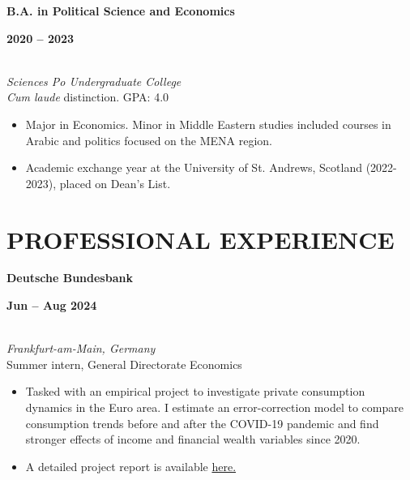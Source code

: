 \documentclass[a4paper,9pt]{extarticle}
\begin{document}
\noindent
\begin{minipage}[t]{0.7\textwidth}
  \textbf{B.A. in Political Science and Economics}
\end{minipage}%
\begin{minipage}[t]{0.3\textwidth}
  \raggedleft \textbf{2020 -- 2023}
\end{minipage}
\\
\textit{Sciences Po Undergraduate College} \\
\textit{Cum laude} distinction. GPA: 4.0
\begin{itemize}[noitemsep, topsep=0pt, left=0.65cm]
    \item Major in Economics. Minor in Middle Eastern studies included courses in Arabic and politics focused on the MENA region. 
    \item Academic exchange year at the University of St. Andrews, Scotland (2022-2023), placed on Dean's List. 
\end{itemize} 


\section*{PROFESSIONAL EXPERIENCE}

\noindent
\newline
\begin{minipage}[t]{0.7\textwidth}
  \textbf{Deutsche Bundesbank}
\end{minipage}%
\begin{minipage}[t]{0.3\textwidth}
  \raggedleft \textbf{Jun -- Aug 2024}
\end{minipage}
\\
\textit{Frankfurt-am-Main, Germany} \\ 
Summer intern, General Directorate Economics 
\begin{itemize}[noitemsep, topsep=0pt, left=0.65cm]
    \item  Tasked with an empirical project to investigate private consumption dynamics in the Euro area. I estimate an error-correction model to compare consumption trends before and after the COVID-19 pandemic and find stronger effects of income and financial wealth variables since 2020.
    \item A detailed project report is available \href{https://lionelchambon.github.io/files/Chambon_BundesbankProject_EN.pdf}{here.}
    \\
\end{itemize}
\end{document}
